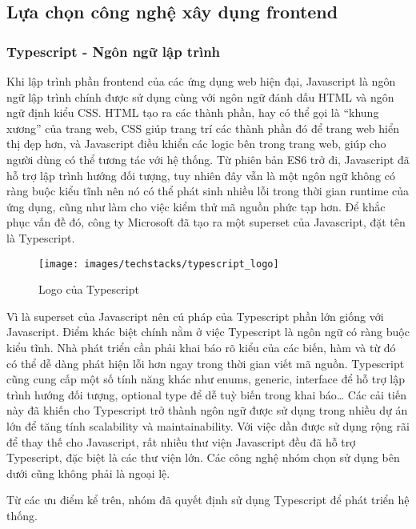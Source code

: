 \documentclass[../main.tex]{subfiles}
\begin{document}
	\subsection{Lựa chọn công nghệ xây dụng \Gls{frontend}}

	\subsubsection{Typescript - Ngôn ngữ lập trình}

	Khi lập trình phần \Gls{frontend} của các ứng dụng web hiện đại, Javascript là ngôn ngữ lập trình chính được sử dụng
	cùng với ngôn ngữ đánh dấu HTML và ngôn ngữ định kiểu CSS. HTML tạo ra các thành phần, hay có thể gọi là ``khung
	xương'' của trang web, CSS giúp trang trí các thành phần đó để trang web hiển thị đẹp hơn, và Javascript điều khiển
	các logic bên trong trang web, giúp cho người dùng có thể tương tác với hệ thống. Từ phiên bản ES6 trở đi, Javascript
	đã hỗ trợ lập trình hướng đối tượng, tuy nhiên đây vẫn là một ngôn ngữ không có ràng buộc kiểu tĩnh nên nó có thể phát
	sinh nhiều lỗi trong thời gian runtime của ứng dụng, cũng như làm cho việc kiểm thử mã nguồn phức tạp hơn. Để khắc
	phục vấn đề đó, công ty Microsoft đã tạo ra một superset của Javascript, đặt tên là Typescript.

	\begin{figure}[ht]
		\centering
		\texttt{[image: images/techstacks/typescript\_logo]}
		\caption{Logo của Typescript}
		\label{fig:ts-logo}
	\end{figure}

	Vì là superset của Javascript nên cú pháp của Typescript phần lớn giống với Javascript. Điểm khác biệt chính nằm ở
	việc Typescript là ngôn ngữ có ràng buộc kiểu tĩnh. Nhà phát triển cần phải khai báo rõ kiểu của các biến, hàm và từ
	đó có thể dễ dàng phát hiện lỗi hơn ngay trong thời gian viết mã nguồn. Typescript cũng cung cấp một số tính năng khác
	như enums, generic, interface để hỗ trợ lập trình hướng đối tượng, optional type để dễ tuỳ biến trong khai báo\ldots
	Các cải tiến này đã khiến cho Typescript trở thành ngôn ngữ được sử dụng trong nhiều dự án lớn để tăng tính
	scalability và maintainability. Với việc dần được sử dụng rộng rãi để thay thế cho Javascript, rất nhiều thư viện
	Javascript đều đã hỗ trợ Typescript, đặc biệt là các thư viện lớn. Các công nghệ nhóm chọn sử dụng bên dưới cũng không
	phải là ngoại lệ.

	Từ các ưu điểm kể trên, nhóm đã quyết định sử dụng Typescript để phát triển hệ thống.
\end{document}
